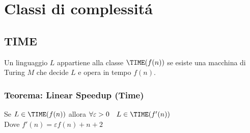 \section{Classi di complessitá}

\subsection{TIME}
Un linguaggio $L$ appartiene alla classe $\TIME(f(n))$ se esiste una macchina di Turing $M$ che decide $L$ e opera in tempo $f(n)$.

\subsubsection{Teorema: Linear Speedup (Time)}
Se $L \in \TIME(f(n))$ allora $\forall \varepsilon > 0 \quad L \in \TIME(f'(n))$ \\
Dove $f'(n) = \varepsilon f(n) + n + 2$

